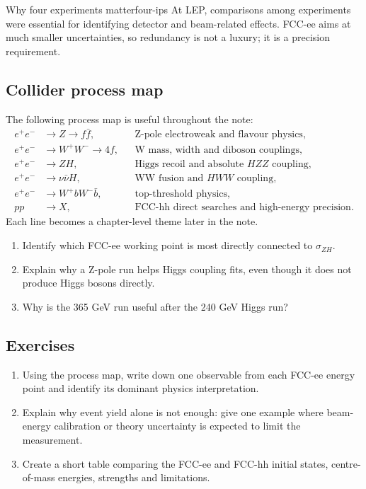 \documentclass[11pt,a4paper]{article}
\numberwithin{equation}{section}
\begin{document}
\begin{remarkbox}{Why four experiments matter}{four-ips}
At LEP, comparisons among experiments were essential for identifying detector and beam-related effects. FCC-ee aims at much smaller uncertainties, so redundancy is not a luxury; it is a precision requirement.
\end{remarkbox}

\subsection{Collider process map}
The following process map is useful throughout the note:
\begin{align}
  e^+e^- &\to Z \to f\bar f, && \text{Z-pole electroweak and flavour physics},\\
  e^+e^- &\to W^+W^- \to 4f, && \text{W mass, width and diboson couplings},\\
  e^+e^- &\to ZH, && \text{Higgs recoil and absolute \(HZZ\) coupling},\\
  e^+e^- &\to \nu\bar\nu H, && \text{WW fusion and \(HWW\) coupling},\\
  e^+e^- &\to W^+bW^-\bar b, && \text{top-threshold physics},\\
  pp &\to X, && \text{FCC-hh direct searches and high-energy precision}.
\end{align}
Each line becomes a chapter-level theme later in the note.

\begin{guidedchecksbox}
\begin{enumerate}[leftmargin=1.6em]
\item Identify which FCC-ee working point is most directly connected to \(\sigma_{ZH}\).
\item Explain why a Z-pole run helps Higgs coupling fits, even though it does not produce Higgs bosons directly.
\item Why is the 365 GeV run useful after the 240 GeV Higgs run?
\end{enumerate}
\end{guidedchecksbox}

\subsection{Exercises}
\begin{enumerate}[leftmargin=1.6em]
\item Using the process map, write down one observable from each FCC-ee energy point and identify its dominant physics interpretation.
\item Explain why event yield alone is not enough: give one example where beam-energy calibration or theory uncertainty is expected to limit the measurement.
\item Create a short table comparing the FCC-ee and FCC-hh initial states, centre-of-mass energies, strengths and limitations.
\end{enumerate}
\end{document}
